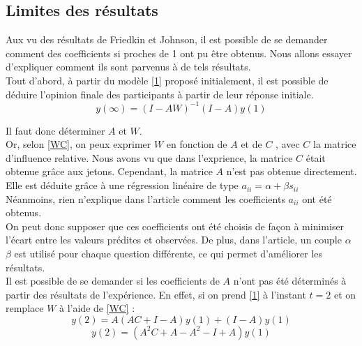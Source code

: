 \documentclass{scrreprt}
\begin{document}
\subsection{Limites des résultats}

Aux vu des résultats de Friedkin et Johnson, il est possible de se demander comment des coefficients si proches de 1 ont pu être obtenus. Nous allons essayer d'expliquer comment ils sont parvenus à de tels résultats.\\

Tout d’abord, à partir du modèle \ref{1} proposé initialement, il est possible de déduire l'opinion finale des participants à partir de leur réponse initiale.\\

\begin{equation}
\label{4}
y(\infty) =(I-AW)^{-1}(I-A)y(1)
\end{equation}

Il faut donc déterminer $A$ et $W$.\\

Or, selon \ref{WC}, on peux exprimer $W$ en fonction de $A$ et de $C$ , avec $C$ la matrice d’influence relative. Nous avons vu que dans l'exprience, la matrice $C$ était obtenue grâce aux jetons. Cependant, la matrice $A$ n'est pas obtenue directement. Elle est déduite grâce à une régression linéaire de type $a_{ii} = \alpha + \beta s_{ii}$\\

Néanmoins, rien n’explique dans l’article comment les coefficients $a_{ii}$ ont été obtenus.\\

On peut donc supposer que ces coefficients ont été choisis de façon à minimiser l'écart entre les valeurs prédites et observées. De plus, dans l'article, un couple $\alpha$ $\beta$ est utilisé pour chaque question différente, ce qui permet d'améliorer les résultats.\\

Il est possible de se demander si les coefficients de $A$ n'ont pas été déterminés à partir des résultats de l'expérience. En effet, si on prend \ref{1} à l’instant $t=2$ et on remplace $W$ à l’aide de \ref{WC} :\\

\begin{equation}
\label{5}
y(2) =A(AC+I-A)y(1)+(I-A)y(1)
\end{equation}
\begin{equation}
\label{6}
y(2) =(A^{2}C+A-A^{2}-I+A)y(1)
\end{equation}
\end{document}
